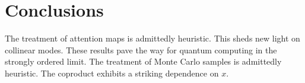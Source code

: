 \section{Conclusions}\label{sec:conclusions}

The treatment of attention maps is admittedly heuristic. This sheds new
light on collinear modes. These results pave the way for quantum
computing in the strongly ordered limit. The treatment of Monte Carlo
samples is admittedly heuristic. The coproduct exhibits a striking
dependence on $x$.


